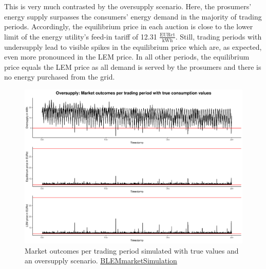 This is very much contrasted by the oversupply scenario. Here, the prosumers' energy supply surpasses the consumers' energy demand in the majority of trading periods. Accordingly, the equilibrium price in each auction is close to the lower limit of the energy utility's feed-in tariff of 12.31 $\frac{\text{EURct}}{\text{kWh}}$. Still, trading periods with undersupply lead to visible spikes in the equilibrium price which are, as expected, even more pronounced in the LEM price. In all other periods, the equilibrium price equals the LEM price as all demand is served by the prosumers and there is no energy purchased from the grid.
%
\begin{figure}[htbp]
    \centering
    \includegraphics[width=\textwidth]{thesis/graphs/marketsimulation/marketoutcome_true_oversupply.pdf}
    \caption[Market outcomes simulated with oversupply and true values]{Market outcomes per trading period simulated with true values and an oversupply scenario. \quantnet\href{}{BLEMmarketSimulation}}
    \label{Fig:marketoutcomes_true_over}
\end{figure}
%

